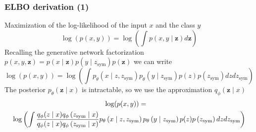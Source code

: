 \documentclass[10pt,xcolor={dvipsnames}]{beamer}
\begin{document}




\begin{frame}
    \frametitle{ELBO derivation (1)}
    Maximization of the log-likelihood of the input $x$ and the class $y$
    $$
        \log (p(x, y))=\log \left(\int p(x, y \mid \mathbf{z}) d \mathbf{z}\right)
    $$
    Recalling the generative network factorization $p(x, y, \mathbf{z})=p(x \mid \mathbf{z}) p(y \mid z_{\text {sym}}) p(\mathbf{z})$ we can write
    $$
        \log (p(x, y)) =
        \log \left(\int p_{\theta}\left(x \mid z, z_{\text {sym}}\right) p_{\theta}\left(y \mid z_{\text {sym}}\right) p(z) p\left(z_{\text {sym}}\right) d z d z_{\text {sym}}\right)
    $$
    The posterior $p_{\theta}(\mathbf{z} \mid x)$ is intractable, so we use the approximation $q_{\phi}(\mathbf{z} \mid x)$
    {\small
    \begin{multline*}
        \hspace{-0.35cm}\log (p(x, y))=\\
        \log \left(\int \frac{q_{\phi}(z \mid x) q_{\phi}\left(z_{\text {sym}} \mid x\right)}{q_{\phi}(z \mid x) q_{\phi}\left(z_{\text {sym}} \mid x\right)} p_{\theta}\left(x \mid z, z_{\text {sym}}\right) p_{\theta}\left(y \mid z_{\text {sym}}\right) p(z) p\left(z_{\text {sym}}\right) d z d z_{\text {sym}}\right)
    \end{multline*}
    }
\end{frame}
\end{document}
